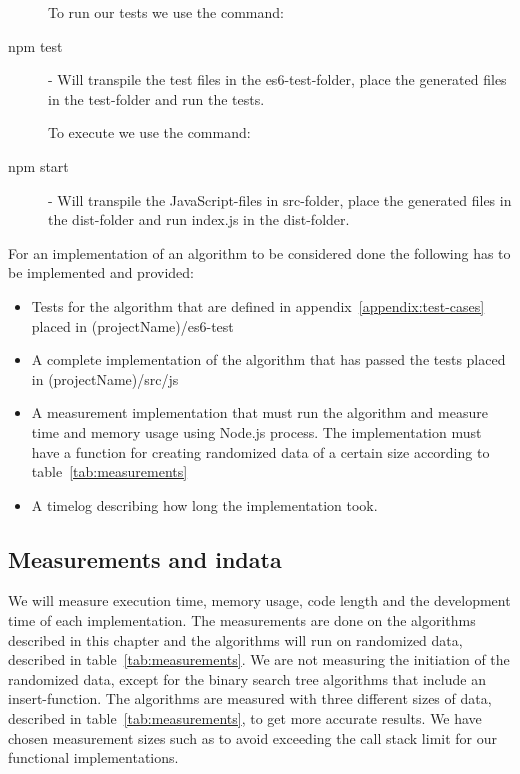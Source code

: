 \documentclass {article}
\begin{document}
\begin{description}
\item[] To run our tests we use the command:
\item[npm test] - Will transpile the test files in the es6-test-folder, place the generated files in the test-folder and run the tests.
\item[] To execute we use the command:
\item[npm start] - Will transpile the JavaScript-files in src-folder, place the generated files in the dist-folder and run index.js in the dist-folder.
\end{description}

For an implementation of an algorithm to be considered done the following has to be implemented and provided:
\begin{itemize}
\item Tests for the algorithm that are defined in appendix~\ref{appendix:test-cases} placed in (projectName)/es6-test
\item A complete implementation of the algorithm that has passed the tests placed in (projectName)/src/js
\item A measurement implementation that must run the algorithm and measure time and memory usage using Node.js process. The implementation must have a function for creating randomized data of a certain size according to table~\ref{tab:measurements} 
\item A timelog describing how long the implementation took. 
\end{itemize}
\subsection{Measurements and indata}
We will measure execution time, memory usage, code length and the development time of each implementation. The measurements are done on the algorithms described in this chapter and the algorithms will run on randomized data, described in table~\ref{tab:measurements}. We are not measuring the initiation of the randomized data, except for the binary search tree algorithms that include an insert-function. The algorithms are measured with three different sizes of data, described in table~\ref{tab:measurements}, to get more accurate results. We have chosen measurement sizes such as to avoid exceeding the call stack limit for our functional implementations.
\end{document}
